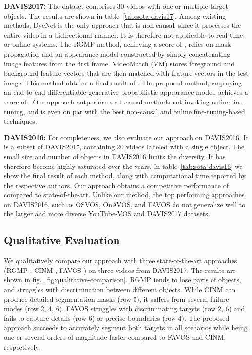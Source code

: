 \documentclass[10pt,twocolumn,letterpaper]{article}
\newcommand{\parsection}[1]{\noindent\textbf{#1:} }
\begin{document}
\parsection{DAVIS2017}
The dataset comprises 30 videos with one or multiple target objects. The results are shown in table~\ref{tab:sota-davis17}. Among existing methods, DyeNet is the only approach that is non-causal, since it processes the entire video in a bidirectional manner. It is therefore not applicable to real-time or online systems. 
The RGMP method, achieving a score of , relies on mask propagation and an appearance model constructed by simply concatenating image features from the first frame. VideoMatch (VM) stores foreground and background feature vectors that are then matched with feature vectors in the test image. This method obtains a final result of . The proposed method, employing an end-to-end differentiable generative probabilistic appearance model, achieves a score of . Our approach outperforms all causal methods not invoking online fine-tuning, and is even on par with the best non-causal and online fine-tuning-based techniques. 

\parsection{DAVIS2016} 
For completeness, we also evaluate our approach on DAVIS2016. It is a subset of DAVIS2017, containing 20 videos labeled with a single object. The small size and number of objects in DAVIS2016 limits the diversity. It has therefore become highly saturated over the years. In table~\ref{tab:sota-davis16} we show the final result of each method, along with computational time reported by the respective authors. Our approach obtains a competitive performance of  compared to state-of-the-art. Unlike our method, the top performing approaches on DAVIS2016, such as OSVOS, OnAVOS, and FAVOS do not generalize well to the larger and more diverse YouTube-VOS and DAVIS2017 datasets. 

\subsection{Qualitative Evaluation}
We qualitatively compare our approach with three state-of-the-art approaches (RGMP \cite{RGMP}, CINM \cite{CINM}, FAVOS \cite{FAVOS}) on three videos from DAVIS2017. The results are shown in fig.~\ref{fig:qualitative-comparison}. RGMP tends to lose parts of objects, and struggles with discrimination between different objects. While CINM can produce detailed segmentation masks (row 5), it suffers from several failure modes (row 2, 4, 6). FAVOS struggles with discriminating targets (row 2, 6) and fails to capture details (row 6) or precise boundaries (row 4). The proposed approach succeeds to accurately segment both targets in all scenarios while being one or several orders of magnitude faster compared to FAVOS and CINM, respectively.
\end{document}
